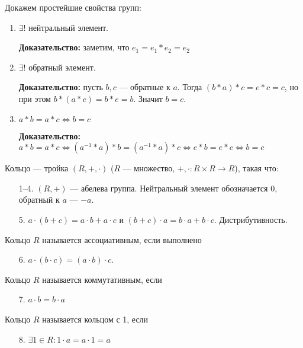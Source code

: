 \slashn
Докажем простейшие свойства групп:
\begin{enumerate}
\item $\exists!$ нейтральный элемент.

    \textbf{Доказательство:} заметим, что $e_1=e_1 \ast e_2 = e_2$
\item $\exists!$ обратный элемент. 

    \textbf{Доказательство:} пусть $b, c$ --- обратные к  $a$. Тогда  $(b\ast a)\ast c = e \ast c = c$, но при этом $b \ast (a \ast c) = b \ast e = b$. Значит  $b=c$.
\item $a \ast b = a \ast c \iff b = c$

    \textbf{Доказательство:} $a \ast b = a \ast c \iff (a^{-1} \ast a) \ast b = (a^{-1} \ast a) \ast c \iff e \ast b = e \ast c \iff b = c$
\end{enumerate}
\begin{definition}
    Кольцо --- тройка $(R, +, \cdot)$ ($R$ --- множество,  $+, \cdot: R \times R \to R$), такая что:
     \begin{enumerate}
         \item[1--4.] $(R, +)$ --- абелева группа. Нейтральный элемент обозначается $0$, обратный к  $a$ ---  $-a$.
         \item[5.] $a\cdot(b+c) = a \cdot b + a \cdot c$ и  $(b+c) \cdot a = b \cdot a + b \cdot c$. Дистрибутивность.
    \end{enumerate}
\end{definition}
\begin{definition}
    Кольцо $R$ называется ассоциативным, если выполнено 
    \begin{itemize}
        \item[6.] $a \cdot (b \cdot c) = (a \cdot b) \cdot c$.
    \end{itemize}
\end{definition}
\begin{definition}
    Кольцо $R$ называется коммутативным, если
    \begin{itemize}
        \item[7.] $a \cdot b = b \cdot a$
    \end{itemize}
\end{definition}
\begin{definition}
    Кольцо $R$ называется кольцом с 1, если  
    \begin{enumerate}
        
        \item[8.] $\exists 1 \in R: 1 \cdot a = a \cdot 1 = a$
    \end{enumerate}
\end{definition}
